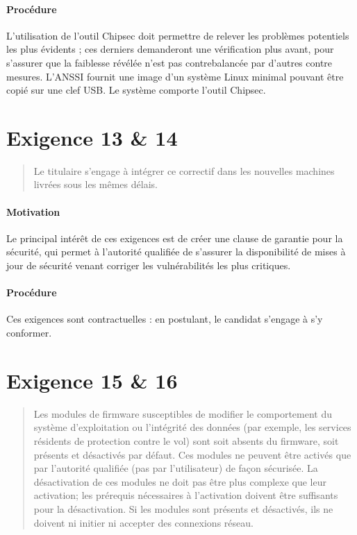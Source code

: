 \documentclass{report}
\begin{document}
\paragraph{Procédure}
%
L’utilisation de l’outil Chipsec doit permettre de relever les problèmes
potentiels les plus évidents ; ces derniers demanderont une vérification plus
avant, pour s’assurer que la faiblesse révélée n’est pas contrebalancée par
d’autres contre mesures.
%
L’ANSSI fournit une image d’un système Linux minimal pouvant être copié sur une
clef USB.
%
Le système comporte l’outil Chipsec.

\section{Exigence 13 \& 14}

\begin{quote}
  Le titulaire s’engage à intégrer ce correctif dans les nouvelles machines
  livrées sous les mêmes délais.
\end{quote}

\paragraph{Motivation}
%
Le principal intérêt de ces exigences est de créer une clause de \og{}garantie
pour la sécurité\fg{}, qui permet à l’autorité qualifiée de s’assurer la
disponibilité de mises à jour de sécurité venant corriger les vulnérabilités les
plus critiques.

\paragraph{Procédure}
%
Ces exigences sont contractuelles : en postulant, le candidat s’engage à s’y
conformer.

\section{Exigence 15 \& 16}

\begin{quote}
  Les modules de firmware susceptibles de modifier le comportement du système
  d’exploitation ou l’intégrité des données (par exemple, les services résidents
  de protection contre le vol) sont soit absents du firmware, soit présents et
  désactivés par défaut.
  Ces modules ne peuvent être activés que par l’autorité qualifiée (pas par
  l’utilisateur) de façon sécurisée.
  La désactivation de ces modules ne doit pas être plus complexe que leur
  activation; les prérequis nécessaires à l’activation doivent être suffisants
  pour la désactivation.
  Si les modules sont présents et désactivés, ils ne doivent ni initier ni
  accepter des connexions réseau.
\end{quote}
\end{document}
